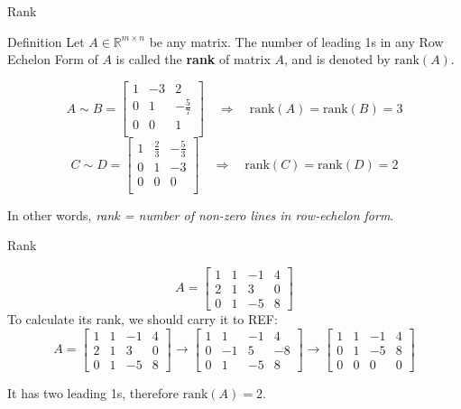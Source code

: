 \documentclass{beamer}
\newcommand{\R}{\mathbb{R}}
\newcommand{\rank}{\text{rank}}
\begin{document}
\begin{frame}{Rank}
\begin{block}{Definition}
Let $A\in\R^{m\times n}$ be any matrix. The number of leading 1s in any Row Echelon Form of $A$ is called the \textbf{rank} of matrix $A$, and is denoted by $\rank(A)$.
\end{block}
\pause
\begin{example}
    \[ A \sim B=\begin{bmatrix}
            1 & -3 & 2 \\
            0 & 1 & -\frac{5}{7} \\
            0 & 0 & 1 \\
        \end{bmatrix} \quad \Rightarrow \quad \rank(A)=\rank(B)=3\]
    \[ C \sim D=\begin{bmatrix}
        1 & \frac{2}{3} & -\frac{5}{3} \\
            0 & 1 & -3 \\
            0 & 0 & 0 \\
         \end{bmatrix}  \quad \Rightarrow \quad \rank(C)=\rank(D)=2\]
\end{example}

\pause 

In other words, \textit{rank = number of non-zero lines in row-echelon form}.

\end{frame}



\begin{frame}{Rank}
\begin{example}
 \[ A = \left[ \begin{array}{rrrr} 1 & 1 & -1 & 4 \\ 2 & 1 & 3 & 0 \\ 0 & 1 & -5 & 8 \end{array} \right]\]
  To calculate its rank, we should carry it to REF:
  \begin{equation*} A = \left[ \begin{array}{rrrr} 1 & 1 & -1 & 4 \\ 2 & 1 & 3 & 0 \\ 0 & 1 & -5 & 8 \end{array} \right] \rightarrow \left[ \begin{array}{rrrr} 1 & 1 & -1 & 4 \\ 0 & -1 & 5 & -8 \\ 0 & 1 & -5 & 8 \end{array} \right] \rightarrow \left[ \begin{array}{rrrr} 1 & 1 & -1 & 4 \\ 0 & 1 & -5 & 8 \\ 0 & 0 & 0 & 0 \end{array} \right] \end{equation*}

  It has two leading 1s, therefore $\rank(A) = 2$.
\end{example}

  
\end{frame}
\end{document}
